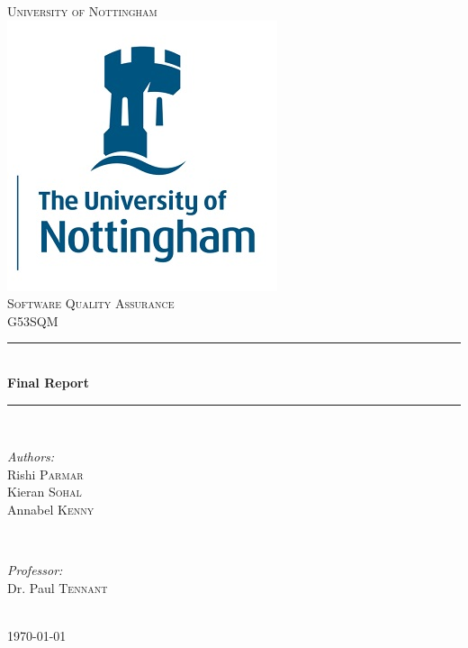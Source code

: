 \documentclass[12pt]{article}
\begin{document}
\begin{titlepage}

\newcommand{\HRule}{\rule{\linewidth}{0.5mm}}

\center 
\textsc{\LARGE University of Nottingham}\\[1.5cm]
\includegraphics[scale=0.4]{uon.jpg}\\[1cm]
\textsc{\Large Software Quality Assurance}\\[0.5cm]
\textsc{\large G53SQM}\\[0.5cm]

\HRule \\[0.4cm]
{ \huge \bfseries Final Report}\\[0.4cm]
\HRule \\[1.5cm]

\begin{minipage}{0.4\textwidth}
\begin{flushleft}
\emph{Authors:}\\
\vspace{0.1cm}
Rishi \textsc{Parmar}\\
Kieran \textsc{Sohal}\\
Annabel \textsc{Kenny}
\end{flushleft}
\end{minipage}
~
\begin{minipage}{0.4\textwidth}
\begin{flushright} 
\emph{Professor:} \\
Dr. Paul \textsc{Tennant}
\end{flushright}
\end{minipage}\\[2cm]

{\large \today}\\[2cm]


\vfill

\end{titlepage}
\end{document}
